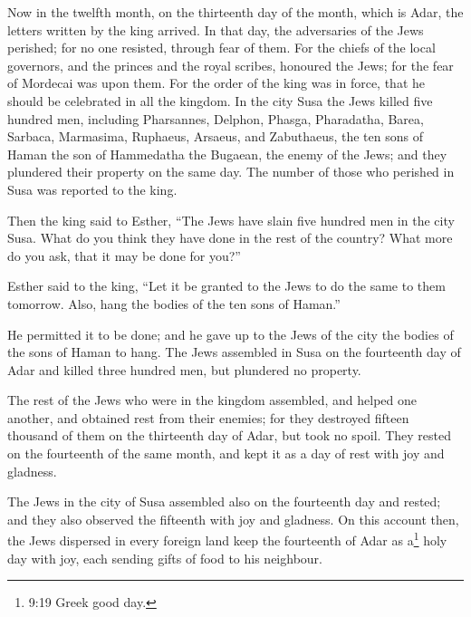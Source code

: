 Now in the twelfth month, on the thirteenth day of the
month, which is Adar, the letters written by the king arrived.
 In that day, the adversaries of the Jews perished; for no
one resisted, through fear of them.  For the chiefs of the
local governors, and the princes and the royal scribes, honoured the
Jews; for the fear of Mordecai was upon them.  For the order
of the king was in force, that he should be celebrated in all the
kingdom.  In the city Susa the Jews killed five hundred men,
 including Pharsannes, Delphon, Phasga, 
Pharadatha, Barea, Sarbaca,  Marmasima, Ruphaeus, Arsaeus,
and Zabuthaeus,  the ten sons of Haman the son of
Hammedatha the Bugaean, the enemy of the Jews; and they plundered their
property on the same day.  The number of those who perished
in Susa was reported to the king.

 Then the king said to Esther, ``The Jews have slain five
hundred men in the city Susa. What do you think they have done in the
rest of the country? What more do you ask, that it may be done for
you?''

 Esther said to the king, ``Let it be granted to the Jews
to do the same to them tomorrow. Also, hang the bodies of the ten sons
of Haman.''

 He permitted it to be done; and he gave up to the Jews of
the city the bodies of the sons of Haman to hang.  The Jews
assembled in Susa on the fourteenth day of Adar and killed three hundred
men, but plundered no property.

 The rest of the Jews who were in the kingdom assembled,
and helped one another, and obtained rest from their enemies; for they
destroyed fifteen thousand of them on the thirteenth day of Adar, but
took no spoil.  They rested on the fourteenth of the same
month, and kept it as a day of rest with joy and gladness.

 The Jews in the city of Susa assembled also on the
fourteenth day and rested; and they also observed the fifteenth with joy
and gladness.  On this account then, the Jews dispersed in
every foreign land keep the fourteenth of Adar as a\footnote{9:19 Greek
  good day.} holy day with joy, each sending gifts of food to his
neighbour.

